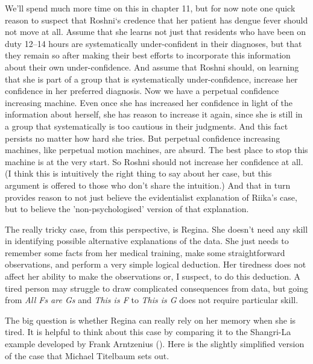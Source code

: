 \documentclass[
  10pt,
  letterpaper,
  twoside]{scrbook}
\begin{document}
We'll spend much more time on this in chapter 11, but for now note one
quick reason to suspect that {Roshni}`s credence that her patient has
dengue fever should not move at all. Assume that she learns not just
that residents who have been on duty 12--14 hours are systematically
under-confident in their diagnoses, but that they remain so after making
their best efforts to incorporate this information about their own
under-confidence. And assume that {Roshni} should, on learning that she
is part of a group that is systematically under-confidence, increase her
confidence in her preferred diagnosis. Now we have a perpetual
confidence increasing machine. Even once she has increased her
confidence in light of the information about herself, she has reason to
increase it again, since she is still in a group that systematically is
too cautious in their judgments. And this fact persists no matter how
hard she tries. But perpetual confidence increasing machines, like
perpetual motion machines, are absurd. The best place to stop this
machine is at the very start. So {Roshni} should not increase her
confidence at all. (I think this is intuitively the right thing to say
about her case, but this argument is offered to those who don't share
the intuition.) And that in turn provides reason to not just believe the
evidentialist explanation of {Riika}'s case, but to believe the
'non-psychologised' version of that explanation.

The really tricky case, from this perspective, is {Regina}. She doesn't
need any skill in identifying possible alternative explanations of the
data. She just needs to remember some facts from her medical training,
make some straightforward observations, and perform a very simple
logical deduction. Her tiredness does not affect her ability to make the
observations or, I suspect, to do this deduction. A tired person may
struggle to draw complicated consequences from data, but going from
\emph{All Fs are Gs} and \emph{This is F} to \emph{This is G} does not
require particular skill.

The big question is whether {Regina} can really rely on her memory when
she is tired. It is helpful to think about this case by comparing it to
the Shangri-La example developed by {Frank} Arntzenius
(). Here is the slightly simplified
version of the case that Michael Titelbaum sets out.
\end{document}
